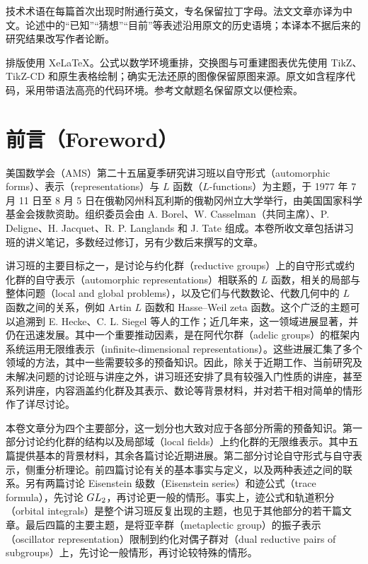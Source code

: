 技术术语在每篇首次出现时附通行英文，专名保留拉丁字母。法文文章亦译为中文。论述中的“已知”“猜想”“目前”等表述沿用原文的历史语境；本译本不据后来的研究结果改写作者论断。

排版使用 XeLaTeX。公式以数学环境重排，交换图与可重建图表优先使用 TikZ、TikZ-CD 和原生表格绘制；确实无法还原的图像保留原图来源。原文如含程序代码，采用带语法高亮的代码环境。参考文献题名保留原文以便检索。
\chapter*{前言（Foreword）}
美国数学会（AMS）第二十五届夏季研究讲习班以自守形式（automorphic forms）、表示（representations）与 $L$ 函数（$L$-functions）为主题，于 1977 年 7 月 11 日至 8 月 5 日在俄勒冈州科瓦利斯的俄勒冈州立大学举行，由美国国家科学基金会拨款资助。组织委员会由 A. Borel、W. Casselman（共同主席）、P. Deligne、H. Jacquet、R. P. Langlands 和 J. Tate 组成。本卷所收文章包括讲习班的讲义笔记，多数经过修订，另有少数后来撰写的文章。

讲习班的主要目标之一，是讨论与约化群（reductive groups）上的自守形式或约化群的自守表示（automorphic representations）相联系的 $L$ 函数，相关的局部与整体问题（local and global problems），以及它们与代数数论、代数几何中的 $L$ 函数之间的关系，例如 Artin $L$ 函数和 Hasse--Weil zeta 函数。这个广泛的主题可以追溯到 E. Hecke、C. L. Siegel 等人的工作；近几年来，这一领域进展显著，并仍在迅速发展。其中一个重要推动因素，是在阿代尔群（adelic groups）的框架内系统运用无限维表示（infinite-dimensional representations）。这些进展汇集了多个领域的方法，其中一些需要较多的预备知识。因此，除关于近期工作、当前研究及未解决问题的讨论班与讲座之外，讲习班还安排了具有较强入门性质的讲座，甚至系列讲座，内容涵盖约化群及其表示、数论等背景材料，并对若干相对简单的情形作了详尽讨论。

本卷文章分为四个主要部分，这一划分也大致对应于各部分所需的预备知识。第一部分讨论约化群的结构以及局部域（local fields）上约化群的无限维表示。其中五篇提供基本的背景材料，其余各篇讨论近期进展。第二部分讨论自守形式与自守表示，侧重分析理论。前四篇讨论有关的基本事实与定义，以及两种表述之间的联系。另有两篇讨论 Eisenstein 级数（Eisenstein series）和迹公式（trace formula），先讨论 $GL_2$，再讨论更一般的情形。事实上，迹公式和轨道积分（orbital integrals）是整个讲习班反复出现的主题，也见于其他部分的若干篇文章。最后四篇的主要主题，是将亚辛群（metaplectic group）的振子表示（oscillator representation）限制到约化对偶子群对（dual reductive pairs of subgroups）上，先讨论一般情形，再讨论较特殊的情形。

